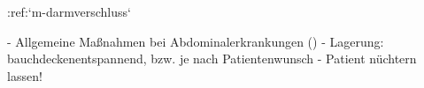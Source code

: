 %
:ref:`m-darmverschluss`%
%
\begin{itemize}
  -   Allgemeine Maßnahmen bei Abdominalerkrankungen
  ()
  -   Lagerung: bauchdeckenentspannend, bzw. je nach
  Patientenwunsch
  -   Patient nüchtern lassen!
\end{itemize}